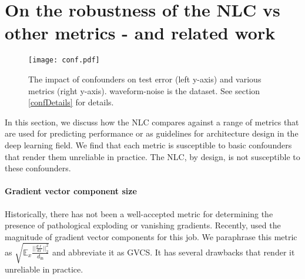 \documentclass{article} %
\begin{document}
\section{On the robustness of the NLC vs other metrics - and related work} \label{metricsSection}

\begin{figure*}[!ht]
\centering
\texttt{[image: conf.pdf]}
\caption{The impact of confounders on test error (left y-axis) and various metrics (right y-axis). waveform-noise is the dataset. See section \ref{confDetails} for details.}\label{conf}
\end{figure*}

In this section, we discuss how the NLC compares against a range of metrics that are used for predicting performance or as guidelines for architecture design in the deep learning field. We find that each metric is susceptible to basic confounders that render them unreliable in practice. The NLC, by design, is not susceptible to these confounders.



\paragraph{Gradient vector component size}

Historically, there has not been a well-accepted metric for determining the presence of pathological exploding or vanishing gradients. Recently, \citet{depthScalesMeanField,resNetMeanField,normalizedInitialization} used the magnitude of gradient vector components for this job. We paraphrase this metric as $\sqrt{\mathbb{E}_{x}\frac{||\frac{d\ell}{dx}||_2^2}{d_\text{in}}}$ and abbreviate it as GVCS. It has several drawbacks that render it unreliable in practice.

\end{document}
